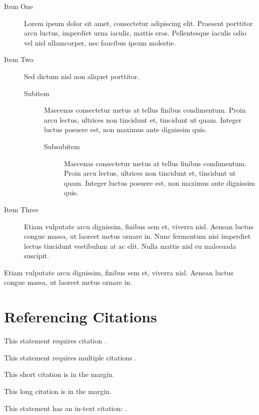 \documentclass[
	letterpaper, %
	12pt, %
]{CSSullivanBusinessReport}
\begin{document}
\begin{description}
	\item[Item One] Lorem ipsum dolor sit amet, consectetur adipiscing elit. Praesent porttitor arcu luctus, imperdiet urna iaculis, mattis eros. Pellentesque iaculis odio vel nisl ullamcorper, nec faucibus ipsum molestie.
	\item[Item Two] Sed dictum nisl non aliquet porttitor.
	\begin{description}
		\item[Subitem] Maecenas consectetur metus at tellus finibus condimentum. Proin arcu lectus, ultrices non tincidunt et, tincidunt ut quam. Integer luctus posuere est, non maximus ante dignissim quis.
		\begin{description}
			\item[Subsubitem] Maecenas consectetur metus at tellus finibus condimentum. Proin arcu lectus, ultrices non tincidunt et, tincidunt ut quam. Integer luctus posuere est, non maximus ante dignissim quis.
	\end{description}
	\end{description}
	\item[Item Three] Etiam vulputate arcu dignissim, finibus sem et, viverra nisl. Aenean luctus congue massa, ut laoreet metus ornare in. Nunc fermentum nisi imperdiet lectus tincidunt vestibulum at ac elit. Nulla mattis nisl eu malesuada suscipit.
\end{description}

Etiam vulputate arcu dignissim, finibus sem et, viverra nisl. Aenean luctus congue massa, ut laoreet metus ornare in.


\section{Referencing Citations}

This statement requires citation \autocite{Smith:2024jd}.

This statement requires multiple citations \autocite{Smith:2024jd, Smith:2023qr}.

This short citation is in the margin.

This long citation is in the margin.

This statement has an in-text citation: \textcite{Smith:2024jd}.
\end{document}
